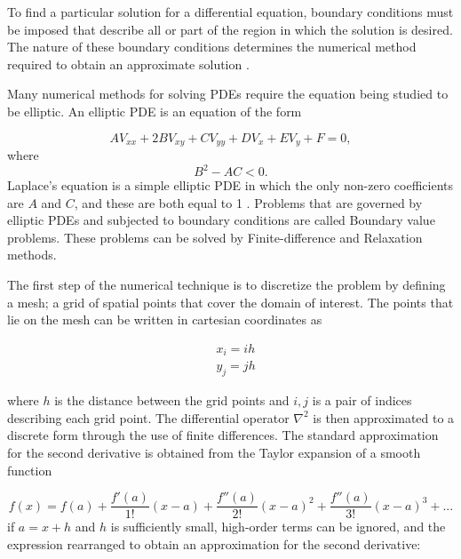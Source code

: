 \documentclass[a4paper]{jpconf}
\begin{document}
To find a particular solution for a differential equation, boundary conditions must be imposed that describe all or part of the region in which the solution is desired. The nature of these boundary conditions determines the numerical method required to obtain an approximate solution \cite{Cheney.Kincai-NumericalMethods}. \par
Many numerical methods for solving PDEs require the equation being studied to be elliptic. An elliptic PDE is an equation of the form

\begin{equation}
	AV_{xx}+2BV_{xy}+CV_{yy}+DV_x+EV_y+F = 0,
	\label{eq:ellipticPDE}
\end{equation}
\noindent where
\begin{equation}
	B^2-AC < 0.
\end{equation}
\noindent Laplace's equation is a simple elliptic PDE in which the only non-zero coefficients are $A$ and $C$, and these are both equal to 1 \cite{RHB-MathematicalMethods}. Problems that are governed by elliptic PDEs and subjected to boundary conditions are called Boundary value problems.
These problems can be solved by Finite-difference and Relaxation methods. \par

The first step of the numerical technique is to discretize the problem by defining a mesh; a grid of  spatial points that cover the domain of interest. The points that lie on the mesh can be written in cartesian coordinates as 

\begin{subequations}
\begin{align}
&x_i = ih\\ 
&y_j = jh
\end{align}
\label{eq:coord}
\end{subequations} 

\noindent where $h$ is the distance between the grid points and $i,j$ is a pair of indices describing each grid point. The differential operator $\nabla^2$ is then approximated 
to a discrete form through the use of finite differences. The standard approximation for the second derivative is obtained from the Taylor expansion of a smooth function \cite{Cheney.Kincai-NumericalMethods} 

\begin{equation}
f(x) = f(a) + \frac{f'(a)}{1!}(x-a) + \frac{f''(a)}{2!}(x-a)^2 + \frac{f''(a)}{3!}(x-a)^3 + ...
\end{equation}
if $a = x+h$ and $h$ is sufficiently small, high-order terms can be ignored, and the expression rearranged to obtain an approximation for the second derivative:
\end{document}

